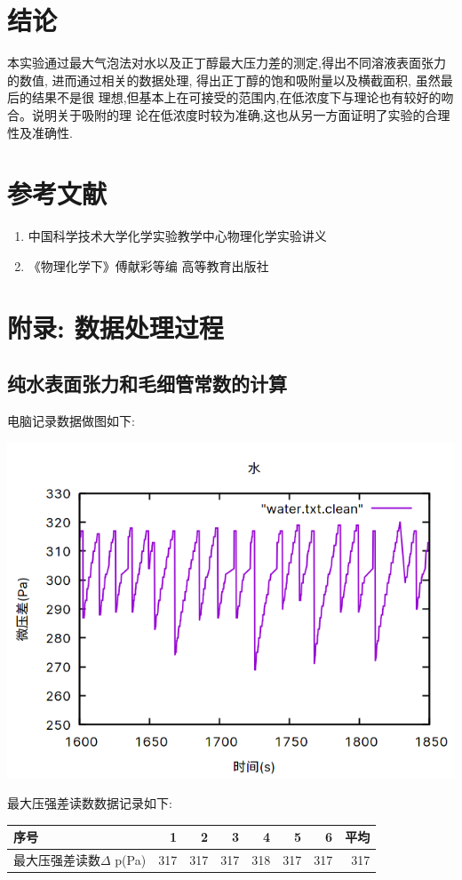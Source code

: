 \documentclass[11pt]{report}
\begin{document}
\part{结论}
\label{sec:org525b459}
  本实验通过最大气泡法对水以及正丁醇最大压力差的测定,得出不同溶液表面张力的数值,
进而通过相关的数据处理, 得出正丁醇的饱和吸附量以及横截面积, 虽然最后的结果不是很
理想,但基本上在可接受的范围内,在低浓度下与理论也有较好的吻合。说明关于吸附的理
论在低浓度时较为准确,这也从另一方面证明了实验的合理性及准确性.
\part{参考文献}
\label{sec:org29752d7}
\begin{enumerate}
\item 中国科学技术大学化学实验教学中心物理化学实验讲义
\item 《物理化学下》傅献彩等编 高等教育出版社
\end{enumerate}

\part{附录: 数据处理过程}
\label{sec:org0d93497}
\chapter{纯水表面张力和毛细管常数的计算}
\label{sec:org1b6381e}
电脑记录数据做图如下:
\begin{center}
\includegraphics[width=.9\linewidth]{../img/water.png}
\end{center}
最大压强差读数数据记录如下:
\begin{center}
\begin{tabular}{lrrrrrrr}
序号 & 1 & 2 & 3 & 4 & 5 & 6 & 平均\\
\hline
最大压强差读数\(\Delta\) p(Pa) & 317 & 317 & 317 & 318 & 317 & 317 & 317\\
\end{tabular}
\end{center}
\end{document}
